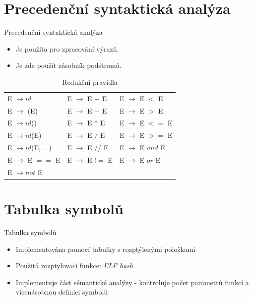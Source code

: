 \documentclass[12pt]{beamer}
\begin{document}
\section{Precedenční syntaktická analýza}
\begin{frame}{Precedenční syntaktická analýza}
\begin{itemize}
\item Je použita pro zpracování výrazů.
\item Je zde použit zásobník podstromů.
\end{itemize}
\begin{table}[!htbp]
\centering
    \begin{tabular}{l l l}
         E $\rightarrow id$ & E $\rightarrow$ E $+$ E & E $\rightarrow$ E $<$ E \\
         E $\rightarrow $ (E) & E $\rightarrow$ E $-$ E & E $\rightarrow$ E $>$ E \\
         E $\rightarrow id$() & E $\rightarrow$ E $*$ E & E $\rightarrow$ E $<=$ E \\
         E $\rightarrow id$(E) & E $\rightarrow$ E $/$ E & E $\rightarrow$ E $>=$ E \\
         E $\rightarrow id$(E, ...) & E $\rightarrow$ E $//$ E & E $\rightarrow$ E $and$ E \\
         E $\rightarrow$ E $==$ E & E $\rightarrow$ E $!=$ E & E $\rightarrow$ E $or$ E \\
         E $\rightarrow not$ E & &  \\
    \end{tabular}
    \caption{Redukční pravidla}
    \label{tab:2}
\end{table}
\end{frame}

\section{Tabulka symbolů}
\begin{frame}{Tabulka symbolů}
\begin{itemize}
\item Implementována pomocí tabulky s rozptýlenými položkami
\item Použitá rozptylovací funkce: \emph{ELF hash}
\item Implementuje část sémantické analýzy - kontroluje počet parametrů funkcí a vícenásobnou definici symbolů
\end{itemize}
\end{frame}
\end{document}
